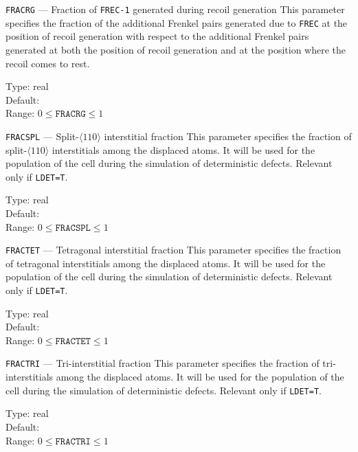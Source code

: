 \begin{keydescription}{\texttt{FRACRG} --- Fraction of \texttt{FREC-1}
    generated during recoil generation}
%
  This parameter specifies the fraction of the additional Frenkel pairs
  generated due to \texttt{FREC} at the position of recoil generation
  with respect to the additional Frenkel pairs generated at both the
  position of recoil generation and at the position where the recoil
  comes to rest.
  \begin{keytab}
    Type:    \> real \\
    Default:  \\
    Range:   \> $0 \le \texttt{FRACRG} \le 1$
  \end{keytab}
\end{keydescription}

\ifprivate
\begin{keydescription}{\texttt{FRACSPL} --- Split-$\langle 110 \rangle$ interstitial fraction}
%
  This parameter specifies the fraction of split-$\langle 110 \rangle$
  interstitials among the displaced atoms. It will be used for
  the population of the cell during the simulation of deterministic defects.
  Relevant only if \texttt{LDET=T}. 
  \begin{keytab}
    Type:    \> real \\
    Default:  \\
    Range:   \> $0 \le \texttt{FRACSPL} \le 1$
  \end{keytab}
\end{keydescription}


\begin{keydescription}{\texttt{FRACTET} --- Tetragonal interstitial fraction}
%
  This parameter specifies the fraction of tetragonal interstitials among
  the displaced atoms. It will be used for the population of the cell during
  the simulation of deterministic defects. Relevant only if
  \texttt{LDET=T}. 
  \begin{keytab}
    Type:    \> real \\
    Default:  \\
    Range:   \> $0 \le \texttt{FRACTET} \le 1$
  \end{keytab}
\end{keydescription}

\begin{keydescription}{\texttt{FRACTRI} --- Tri-interstitial fraction}
%
  This parameter specifies the fraction of tri-interstitials among the
  displaced atoms. It will be used for the population of the cell during the
  simulation of deterministic defects. Relevant only if
  \texttt{LDET=T}. 
  \begin{keytab}
    Type:    \> real \\
    Default:  \\
    Range:   \> $0 \le \texttt{FRACTRI} \le 1$
  \end{keytab}
\end{keydescription}
\fi

